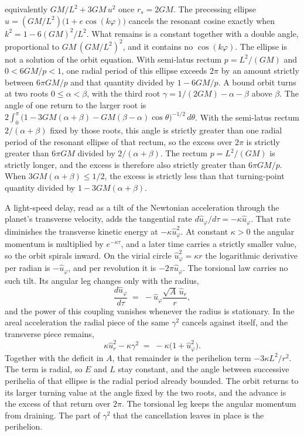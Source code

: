 \documentclass[a4paper]{article}
\begin{document}
equivalently \(GM/L^{2}+3GM\,u^{2}\) once \(r_{s}=2GM\). The precessing ellipse \(u=(GM/L^{2})\bigl(1+e\cos(k\varphi)\bigr)\) cancels the resonant cosine exactly when \(k^{2}=1-6(GM)^{2}/L^{2}\). What remains is a constant together with a double angle, proportional to \(GM\,(GM/L^{2})^{2}\), and it contains no \(\cos(k\varphi)\). The ellipse is not a solution of the orbit equation. With semi-latus rectum \(p=L^{2}/(GM)\) and \(0<6GM/p<1\), one radial period of this ellipse exceeds \(2\pi\) by an amount strictly between \(6\pi GM/p\) and that quantity divided by \(1-6GM/p\). A bound orbit turns at two roots \(0\le\alpha<\beta\), with the third root \(\gamma=1/(2GM)-\alpha-\beta\) above \(\beta\). The angle of one return to the larger root is \(2\int_{0}^{\pi}\bigl(1-3GM(\alpha+\beta)-GM(\beta-\alpha)\cos\theta\bigr)^{-1/2}\,d\theta\). With the semi-latus rectum \(2/(\alpha+\beta)\) fixed by those roots, this angle is strictly greater than one radial period of the resonant ellipse of that rectum, so the excess over \(2\pi\) is strictly greater than \(6\pi GM\) divided by \(2/(\alpha+\beta)\). The rectum \(p=L^{2}/(GM)\) is strictly longer, and the excess is therefore also strictly greater than \(6\pi GM/p\). When \(3GM(\alpha+\beta)\le 1/2\), the excess is strictly less than that turning-point quantity divided by \(1-3GM(\alpha+\beta)\).

A light-speed delay, read as a tilt of the Newtonian acceleration through the planet's transverse velocity, adds the tangential rate \(d\hat{u}_{\varphi}/d\tau=-\kappa\hat{u}_{\varphi}\). That rate diminishes the transverse kinetic energy at \(-\kappa\hat{u}_{\varphi}^{2}\). At constant \(\kappa>0\) the angular momentum is multiplied by \(e^{-\kappa\tau}\), and a later time carries a strictly smaller value, so the orbit spirals inward. On the virial circle \(\hat{u}_{\varphi}^{2}=\kappa r\) the logarithmic derivative per radian is \(-\hat{u}_{\varphi}\), and per revolution it is \(-2\pi\hat{u}_{\varphi}\). The torsional law carries no such tilt. Its angular leg changes only with the radius,
\begin{equation}
\frac{d\hat{u}_{\varphi}}{d\tau} \;=\; -\hat{u}_{\varphi}\frac{\sqrt{A}\,\hat{u}_{r}}{r},
\label{eq:angular-leg}
\end{equation}
and the power of this coupling vanishes whenever the radius is stationary. In the areal acceleration the radial piece of the same \(\gamma^{2}\) cancels against itself, and the transverse piece remains,
\begin{equation}
\kappa\hat{u}_{r}^{2}-\kappa\gamma^{2} \;=\; -\kappa\bigl(1+\hat{u}_{\varphi}^{2}\bigr).
\label{eq:radial-cancels}
\end{equation}
Together with the deficit in \(A\), that remainder is the perihelion term \(-3\kappa L^{2}/r^{2}\). The term is radial, so \(E\) and \(L\) stay constant, and the angle between successive perihelia of that ellipse is the radial period already bounded. The orbit returns to its larger turning value at the angle fixed by the two roots, and the advance is the excess of that return over \(2\pi\). The torsional leg keeps the angular momentum from draining. The part of \(\gamma^{2}\) that the cancellation leaves in place is the perihelion.
\end{document}
